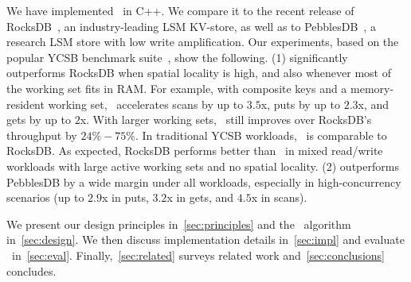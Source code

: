 We have implemented \sys\ in C++. We compare it to the recent release of RocksDB~\cite{RocksDB}, 
an industry-leading LSM KV-store, as well as to PebblesDB~\cite{PebblesDB}, a research LSM store 
with low write amplification. Our experiments, based on the popular YCSB benchmark suite~\cite{YCSB}, 
show the following. (1) \sys\/ significantly outperforms RocksDB when spatial  locality is high, and also 
whenever most of the working set fits in RAM. For example, with composite keys and a memory-resident 
working set, \sys\  accelerates scans by up to $3.5$x, puts by up to $2.3$x, and gets by up to $2$x. 
With larger working sets, \sys\ still improves over RocksDB's throughput by $24\% - 75\%$. In traditional
YCSB workloads,  \sys\ is comparable to RocksDB. As expected, RocksDB performs better than 
\sys\ in mixed read/write workloads with large active working sets and no spatial locality. (2) \sys\/ 
outperforms PebblesDB by a wide margin under all workloads, especially in high-concurrency 
scenarios (up to $2.9$x in puts, $3.2$x in gets, and $4.5$x in scans). 

We present our design principles in~\cref{sec:principles} and  the \sys\ algorithm 
in~\cref{sec:design}. We then discuss implementation details in~\cref{sec:impl} and evaluate 
\sys\ in~\cref{sec:eval}.  Finally,~\cref{sec:related}   surveys related work and~\cref{sec:conclusions}
concludes. 
